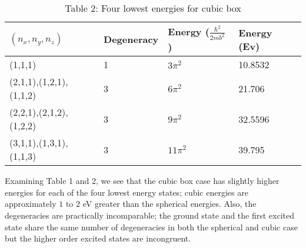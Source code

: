 \documentclass{article}
\numberwithin{equation}{section}
\begin{document}
\begin{table}[t]
\begin{center}
\begin{tabular}{|l |l |l|l|} 
  \hline
 $(n_x,n_y,n_z)$ & Degeneracy& Energy ($\frac{\hbar^2}{2mb^2}$)  & Energy (Ev) \\
  \hline
  (1,1,1) & 1 & $3\pi^2$&10.8532\\ \hline
  (2,1,1),(1,2,1),(1,1,2) & 3 &$6\pi^2$&21.706 \\ \hline
  (2,2,1),(2,1,2),(1,2,2) & 3 &$9\pi^2$&32.5596 \\ \hline
  (3,1,1),(1,3,1),(1,1,3) & 3 &$11\pi^2$&39.795 \\ \hline
\end{tabular}
\caption{Table 2: Four lowest energies for cubic box}
\end{center}
\end{table}

Examining Table 1 and 2, we see that the cubic box case has slightly higher energies for each of the four lowest energy states; cubic energies are approximately $1$ to $2$ eV greater than the spherical energies. Also, the degeneracies are practically incomparable; the ground state and the first excited state share the same number of degeneracies in both the spherical and cubic case but the higher order excited states are incongruent. 
\end{document}
